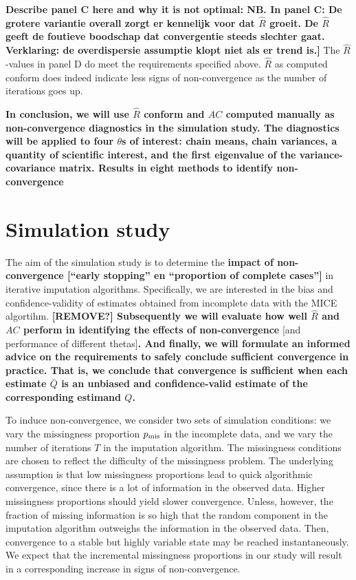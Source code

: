 \documentclass[Royal,times,sageh]{sagej}
\begin{document}
\textbf{Describe panel C here and why it is not optimal: NB. In panel C: De grotere variantie overall zorgt er kennelijk voor dat \(\widehat{R}\) groeit. De \(\widehat{R}\) geeft de foutieve boodschap dat convergentie steeds slechter gaat. Verklaring: de overdispersie assumptie klopt niet als er trend is.{]}} The \(\widehat{R}\)-values in panel D do meet the requirements specified above. \(\widehat{R}\) as computed conform \citet{veht19} does indeed indicate less signs of non-convergence as the number of iterations goes up. \textbf{\citep[explain the dip in Rhat values at t=2. Namely, because we can only use 2 of the 3 tricks by][ if the number of iterations is very low (t\textless4). That's why the \(\widehat{R}\)s are more similar to the traditional GR.]{veht19}}

\textbf{In conclusion, we will use \(\widehat{R}\) conform \citet{veht19} and \(AC\) computed manually as non-convergence diagnostics in the simulation study. The diagnostics will be applied to four \(\theta\)s of interest: chain means, chain variances, a quantity of scientific interest, and the first eigenvalue of the variance-covariance matrix. Results in eight methods to identify non-convergence}

\hypertarget{simulation-study}{%
\section{Simulation study}\label{simulation-study}}

The aim of the simulation study is to determine the \textbf{impact of non-convergence {[}``early stopping'' en ``proportion of complete cases''{]}} in iterative imputation algorithms. Specifically, we are interested in the bias and confidence-validity of estimates obtained from incomplete data with the MICE algortihm. \textbf{{[}REMOVE?{]} Subsequently we will evaluate how well \(\widehat{R}\) and \(AC\) perform in identifying the effects of non-convergence }{[}and performance of different thetas{]}\textbf{. And finally, we will formulate an informed advice on the requirements to safely conclude sufficient convergence in practice. That is, we conclude that convergence is sufficient when each estimate \(\bar{Q}\) is an unbiased and confidence-valid estimate of the corresponding estimand \(Q\).}

To induce non-convergence, we consider two sets of simulation conditions: we vary the missingness proportion \(p_{\rm mis}\) in the incomplete data, and we vary the number of iterations \(T\) in the imputation algorithm. The missingness conditions are chosen to reflect the difficulty of the missingness problem. The underlying assumption is that low missingness proportions lead to quick algorithmic convergence, since there is a lot of information in the observed data. Higher missingness proportions should yield slower convergence. Unless, however, the fraction of missing information is so high that the random component in the imputation algorithm outweighs the information in the observed data. Then, convergence to a stable but highly variable state may be reached instantaneously. We expect that the incremental missingness proportions in our study will result in a corresponding increase in signs of non-convergence.
\end{document}
